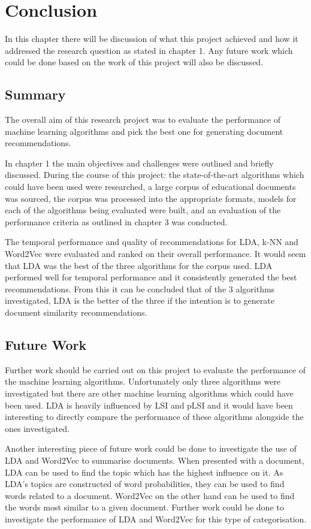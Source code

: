 \chapter{Conclusion}
In this chapter there will be discussion of what this project achieved and how it addressed the research question as stated in chapter 1.
Any future work which could be done based on the work of this project will also be discussed.

\section{Summary}
The overall aim of this research project was to evaluate the performance of machine learning algorithms and pick the best one for generating document recommendations.

In chapter 1 the main objectives and challenges were outlined and briefly discussed.
During the course of this project: the state-of-the-art algorithms which could have been used were researched, a large corpus of educational documents was sourced, the corpus was processed into the appropriate formats, models for each of the algorithms being evaluated were built, and an evaluation of the performance criteria as outlined in chapter 3 was conducted.

The temporal performance and quality of recommendations for LDA, k-NN and Word2Vec were evaluated and ranked on their overall performance.
It would seem that LDA was the best of the three algorithms for the corpus used.
LDA performed well for temporal performance and it consistently generated the best recommendations.
From this it can be concluded that of the 3 algorithms investigated, LDA is the better of the three if the intention is to generate document similarity recommendations.

\section{Future Work}
Further work should be carried out on this project to evaluate the performance of the machine learning algorithms.
Unfortunately only three algorithms were investigated but there are other machine learning algorithms which could have been used.
LDA is heavily influenced by LSI and pLSI and it would have been interesting to directly compare the performance of these algorithms alongside the ones investigated.

Another interesting piece of future work could be done to investigate the use of LDA and Word2Vec to summarise documents.
When presented with a document, LDA can be used to find the topic which has the highest influence on it.
As LDA's topics are constructed of word probabilities, they can be used to find words related to a document.
Word2Vec on the other hand can be used to find the words most similar to a given document.
Further work could be done to investigate the performance of LDA and Word2Vec for this type of categorisation.
